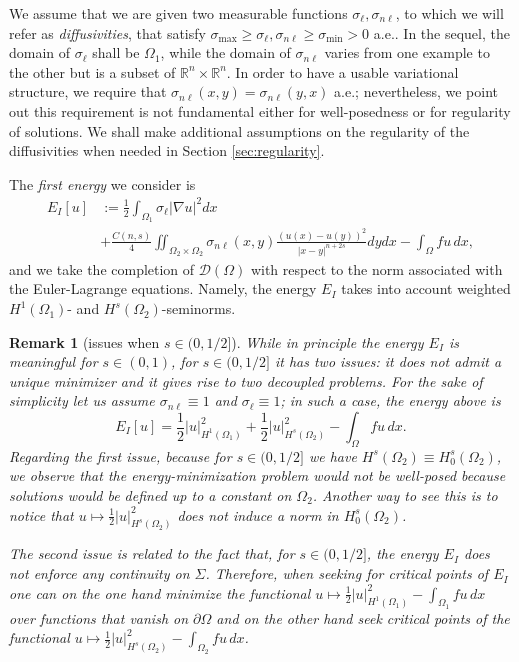 \documentclass{amsart}
\newcommand{\Ol}{\Omega_{1}}%
\newcommand{\Onl}{\Omega_{2}}%
\renewcommand{\sl}{{\sigma_\ell}}
\newcommand{\snl}{{\sigma_{n\ell}}}
\def\Om{\Omega}
\def\rn{{{\mathbb R}^n}}
\theoremstyle{plain}
\newtheorem{remark}{Remark}
\numberwithin{equation}{section}
\numberwithin{table}{section}
\numberwithin{figure}{section}
\numberwithin{theorem}{section}
\numberwithin{corollary}{section}
\numberwithin{definition}{section}
\numberwithin{lemma}{section}
\numberwithin{proposition}{section}
\numberwithin{remark}{section}
\begin{document}
We assume that we are given two measurable functions $\sl, \snl$, to which we will refer as {\em diffusivities}, that satisfy $\sigma_{\max}\ge\sl, \snl \ge\sigma_{\min}>0$ a.e.. In the sequel, the domain of $\sl$ shall be $\Ol$, while the domain of $\snl$ varies from one example to the other but is a subset of $\rn \times \rn$. In order to have a usable variational structure, we require that $\snl (x,y) = \snl(y,x)$ a.e.; nevertheless, we point out this requirement is not fundamental either for well-posedness or for regularity of solutions. 
We shall make additional assumptions on the regularity of the diffusivities when needed in Section \ref{sec:regularity}.


The \emph{first energy} we consider is
\begin{equation} \label{eq:energy-I}
\begin{split}
E_{I}[u] & :=  \frac12 \int_{\Ol} \sl |\nabla u |^2 dx \\
&+ \frac{C(n,s)}{4} \iint_{\Onl \times \Onl} \snl(x,y) \frac{(u(x)-u(y))^2}{|x-y|^{n+2s}} dy dx
 - \int_\Omega f u \, dx,
\end{split} 
\end{equation}
and we take the completion of ${\mathcal D}(\Om)$ with respect to the norm associated with the Euler-Lagrange equations.
Namely, the energy $E_I$ takes into account weighted $H^1(\Ol)$- and $H^s(\Onl)$-seminorms.


\begin{remark}[issues when $s \in (0,1/2{]}$] \label{rem:issues}
While in principle the energy $E_{I}$ is meaningful for $s\in (0,1)$, for $s \in (0,1/2]$ it has two issues:
it does not admit a unique minimizer and it gives rise to two \emph{decoupled problems}. For the sake of simplicity let us assume $\snl \equiv 1$ and $\sl \equiv 1$; in such a case, the energy above is
\[
E_{I}[u] = \frac12 |u|^2_{H^1(\Ol)}+ \frac12 |u|^2_{H^s(\Onl)} - \int_\Omega f u \, dx. 
\]
Regarding the first issue, because for $s \in (0,1/2]$ we have $H^s(\Onl) \equiv H^s_0(\Onl)$, we observe that the energy-minimization problem would not be well-posed because solutions would be defined up to a constant on $\Onl$. Another way to see this is to notice that $u \mapsto \frac12 |u|^2_{H^s(\Onl)}$ does not induce a norm in $H^s_0(\Onl)$.

The second issue is related to the fact that, for $s \in (0,1/2]$, the energy $E_I$ does not enforce any continuity on $\Sigma$. Therefore, when seeking for critical points of $E_I$ one can on the one hand minimize the functional $u \mapsto \frac12 |u|^2_{H^1(\Ol)} - \int_{\Ol} f u \, dx$ over functions that vanish on $\partial \Omega$ and on the other hand seek critical points of the functional  $u \mapsto \frac12 |u|^2_{H^s(\Onl)} - \int_{\Onl} f u \, dx$.
\end{remark}
\end{document}
